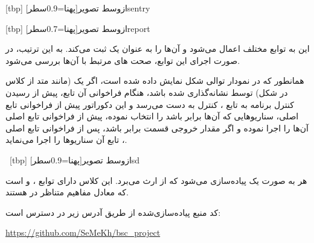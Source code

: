 

[tbp]
‌ازوسط
‌تصویر[پهنا=0.9‌سطر]{sentry}


[tbp]
‌ازوسط
‌تصویر[پهنا=0.7‌سطر]{report}


این  به توابع مختلف اعمال می‌شود و آن‌ها را به عنوان یک
  ثبت می‌کند. به این ترتیب، در صورت اجرای
این توابع، صحت ‌های مرتبط با آن‌ها بررسی می‌شود.

همانطور که در نمودار توالی شکل  نمایش داده شده است، اگر
یک  (مانند متد  از کلاس  در شکل)
توسط   نشانه‌گذاری شده باشد، هنگام فراخوانی
آن تابع، پیش از رسیدن کنترل برنامه به تابع ، کنترل به دست
 می‌رسد و این دکوراتور پیش از فراخوانی تابع اصلی،
سناریو‌هایی که  آن‌ها برابر  باشد را انتخاب نموده،
پیش از فراخوانی تابع اصلی  آن‌ها را اجرا نموده و اگر مقدار
خروجی قسمت  برابر  باشد، پس از فراخوانی تابع اصلی
، تابع  آن سناریوها را اجرا می‌نماید.

\
[tbp]
‌ازوسط
‌تصویر[پهنا=0.9‌سطر]{sd}

 هر  به صورت یک
\واژه{کلاس} پیاده‌سازی می‌شود که از \کد{Scenario} ارث می‌برد. این کلاس
دارای توابع \کد{given}، \کد{when} و \کد{then} است که معادل مفاهیم
متناظر در \واژه{بی.دی.دی.} هستند.

کد منبع  پیاده‌سازی‌شده از طریق آدرس زیر در دسترس است:

\begin{center}
\url{https://github.com/SeMeKh/bsc_project}
\end{center}
